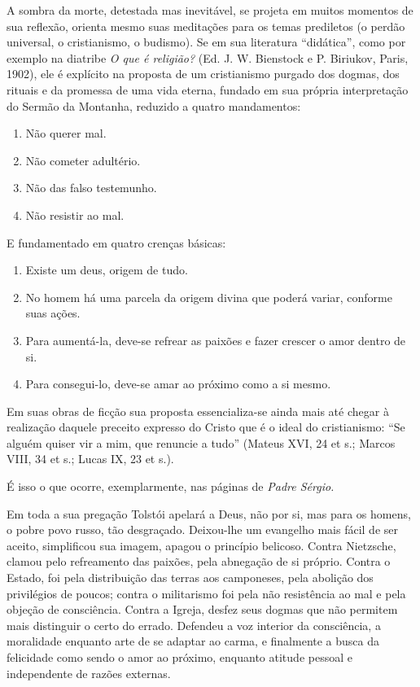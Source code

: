 A sombra da morte, detestada mas inevitável, se projeta em muitos
momentos de sua reflexão, orienta mesmo suas meditações para os temas
prediletos (o perdão universal, o cristianismo, o budismo). Se em sua
literatura ``didática'', como por exemplo na diatribe \emph{O que é
religião?} (Ed. J. W. Bienstock e P. Biriukov, Paris, 1902), ele é
explícito na proposta de um cristianismo purgado dos dogmas, dos rituais
e da promessa de uma vida eterna, fundado em sua própria interpretação
do Sermão da Montanha, reduzido a quatro mandamentos:

\begin{enumerate}
\def\labelenumi{\arabic{enumi})}
\item
  Não querer mal.
\item
  Não cometer adultério.
\item
  Não das falso testemunho.
\item
  Não resistir ao mal.
\end{enumerate}

E fundamentado em quatro crenças básicas:

\begin{enumerate}
\def\labelenumi{\arabic{enumi})}
\item
  Existe um deus, origem de tudo.
\item
  No homem há uma parcela da origem divina que poderá variar, conforme
  suas ações.
\item
  Para aumentá-la, deve-se refrear as paixões e fazer crescer o amor
  dentro de si.
\item
  Para consegui-lo, deve-se amar ao próximo como a si mesmo.
\end{enumerate}

Em suas obras de ficção sua proposta essencializa-se ainda mais até
chegar à realização daquele preceito expresso do Cristo que é o ideal do
cristianismo: ``Se alguém quiser vir a mim, que renuncie a tudo''
(Mateus XVI, 24 et s.; Marcos VIII, 34 et s.; Lucas IX, 23 et s.).

É isso o que ocorre, exemplarmente, nas páginas de \emph{Padre Sérgio.}

Em toda a sua pregação Tolstói apelará a Deus, não por si, mas para os
homens, o pobre povo russo, tão desgraçado. Deixou-lhe um evangelho mais
fácil de ser aceito, simplificou sua imagem, apagou o princípio
belicoso. Contra Nietzsche, clamou pelo refreamento das paixões, pela
abnegação de si próprio. Contra o Estado, foi pela distribuição das
terras aos camponeses, pela abolição dos privilégios de poucos; contra o
militarismo foi pela não resistência ao mal e pela objeção de
consciência. Contra a Igreja, desfez seus dogmas que não permitem mais
distinguir o certo do errado. Defendeu a voz interior da consciência, a
moralidade enquanto arte de se adaptar ao carma, e finalmente a busca da
felicidade como sendo o amor ao próximo, enquanto atitude pessoal e
independente de razões externas.

